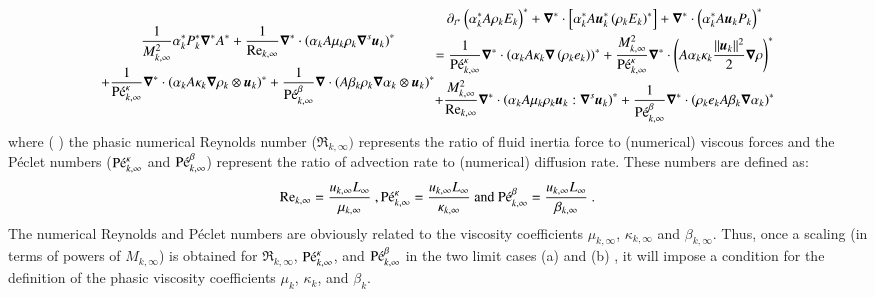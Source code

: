 \documentclass[preprint,10pt]{elsarticle}
\begin{document}
\begin{enumerate}
\begin{subequations}
\begin{multline}
  \frac{1}{M^2_{k,\infty}} \alpha_k^* P^*_k \grad^* A^*  
+ \frac{1}{\Re_{k,\infty}}\grad^* \cdot \left( \alpha_k A \mu_k \rho_k \grad^s \mbold u_k \right)^* \\ 
+ \frac{1}{\Pe_{k,\infty}^\kappa} \grad^* \cdot\left( \alpha_k A \kappa_k \grad \rho_k \otimes \mbold u_k \right)^* 
+ \frac{1}{\Pe_{k,\infty}^\beta} \grad \cdot \left( A \beta_k \rho_k \grad \alpha_k \otimes \mbold u_k \right)^*
\end{multline}
%
\begin{multline}\label{eq:sev_equ-with-diss-terms-ener_case_one_scaled}
\partial_{t^*} \left( \alpha_k^* A \rho_k E_k \right)^* + \grad^* \cdot \left[ \alpha_k^* A \mbold u_k^*  \left( \rho_k E_k \right)^* \right] +  \grad^* \cdot 
\left(\alpha_k^* A \mbold u_k P_k \right)^*  \\ =
\frac{1}{\Pe_{k,\infty}^\kappa} \grad^* \cdot \left( \alpha_k A \kappa_k \grad \left( \rho_k e_k \right) \right)^* 
+ \frac{M^2_{k,\infty}}{\Pe_{k,\infty}^\kappa} \grad^* \cdot \left( A\alpha_k \kappa_k \frac{||\mbold u_k||^2}{2} \grad \rho \right)^*  \\
+ \frac{M^2_{k,\infty}}{\Re_{k,\infty}} \grad^* \cdot \left( \alpha_k A \mu_k \rho_k \mbold u_k : \grad^s \mbold u_k\right)^* 
+ \frac{1}{\Pe_{k,\infty}^\beta } \grad^*\cdot \left( \rho_k e_k A \beta_k \grad \alpha_k \right)^*
\end{multline}
%
\end{subequations}
%
where ( )
the phasic numerical Reynolds number ($\Re_{k,\infty})$ represents the ratio of fluid inertia 
force to (numerical) viscous forces and 
the P\'eclet numbers ($\textrm{P\'e}_{k,\infty}^\kappa$ and $\textrm{P\'e}_{k,\infty}^\beta$) represent the ratio of advection rate to (numerical) diffusion rate. These numbers are defined as:
%
\begin{equation}
\label{eq:ref_numb}
\textrm{Re}_{k,\infty} = \frac{u_{k,\infty} L_\infty}{\mu_{k,\infty}} \ ,
\textrm{P\'e}_{k,\infty}^\kappa = \frac{u_{k,\infty} L_\infty}{\kappa_{k,\infty}} \text{ and }
\textrm{P\'e}_{k,\infty}^\beta = \frac{u_{k,\infty} L_\infty}{\beta_{k,\infty}} \ .
\end{equation}
%
The numerical Reynolds and P\'eclet numbers are obviously related to the 
viscosity coefficients $\mu_{k,\infty}$, $\kappa_{k,\infty}$ and $\beta_{k,\infty}$. Thus, once a scaling (in terms of powers of $M_{k,\infty}$) 
is obtained for $\Re_{k,\infty}$, $\textrm{P\'e}_{k,\infty}^\kappa$, and $\textrm{P\'e}_{k,\infty}^\beta$ in the two limit cases (a) and (b)  , it will 
impose a condition for the definition of the phasic viscosity coefficients $\mu_k$, $\kappa_k$, and $\beta_k$. 
\end{enumerate} 
\end{document}
